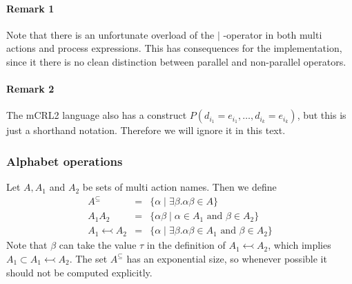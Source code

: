 \documentclass{article}
\begin{document}
\paragraph{Remark 1}

Note that there is an unfortunate overload of the $\boldsymbol{\mid }$%
-operator in both multi actions and process expressions. This has
consequences for the implementation, since it there is no clean distinction
between parallel and non-parallel operators.

\paragraph{Remark 2}

The mCRL2 language also has a construct $P(d_{i_{1}}=e_{i_{1}},\ldots
,d_{i_{k}}=e_{i_{k}})$, but this is just a shorthand notation. Therefore we
will ignore it in this text.

\subsubsection{Alphabet operations}

Let $A,A_{1}$ and $A_{2}$ be sets of multi action names. Then we define%
\[
\begin{array}{lll}
A^{\subseteq } & = & \{\alpha \mid \exists \beta .\alpha \beta \in A\} \\
A_{1}A_{2} & = & \{\alpha \beta \mid \alpha \in A_{1}\text{ and }\beta \in
A_{2}\} \\
A_{1}\leftarrowtail A_{2} & = & \{\alpha \mid \exists \beta .\alpha \beta
\in A_{1}\text{ and }\beta \in A_{2}\}%
\end{array}%
\]%
Note that $\beta $ can take the value $\tau $ in the definition of $%
A_{1}\leftarrowtail A_{2}$, which implies $A_{1}\subset A_{1}\leftarrowtail
A_{2}$. The set $A^{\subseteq }$ has an exponential size, so whenever
possible it should not be computed explicitly.
\end{document}
